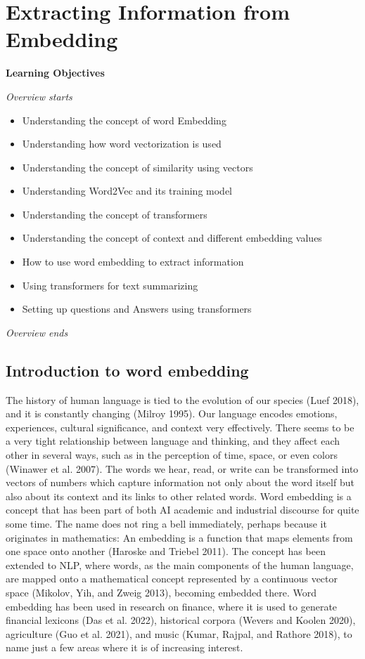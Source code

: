 \chapter{Extracting Information from
Embedding}\label{sec-extracting-information-from-embeddings}

\textbf{Learning Objectives}

\emph{Overview starts}

\begin{itemize}
\tightlist
\item
  Understanding the concept of word Embedding
\item
  Understanding how word vectorization is used
\item
  Understanding the concept of similarity using vectors
\item
  Understanding Word2Vec and its training model
\item
  Understanding the concept of transformers
\item
  Understanding the concept of context and different embedding values
\item
  How to use word embedding to extract information
\item
  Using transformers for text summarizing
\item
  Setting up questions and Answers using transformers
\end{itemize}

\emph{Overview ends}

\section{Introduction to word
embedding}\label{introduction-to-word-embeddings}

The history of human language is tied to the evolution of our species
(Luef 2018), and it is constantly changing (Milroy 1995). Our language
encodes emotions, experiences, cultural significance, and context very
effectively. There seems to be a very tight relationship between
language and thinking, and they affect each other in several ways, such
as in the perception of time, space, or even colors (Winawer et al.
2007). The words we hear, read, or write can be transformed into vectors
of numbers which capture information not only about the word itself but
also about its context and its links to other related words. Word
embedding is a concept that has been part of both AI academic and
industrial discourse for quite some time. The name does not ring a bell
immediately, perhaps because it originates in mathematics: An
embedding is a function that maps elements from one space onto another
(Haroske and Triebel 2011). The concept has been extended to NLP, where
words, as the main components of the human language, are mapped onto a
mathematical concept represented by a continuous vector space (Mikolov, Yih, and Zweig 2013), becoming embedded there. Word embedding has
been used in research on finance, where
it is used to generate financial lexicons (Das et al. 2022),
historical corpora (Wevers and Koolen 2020), agriculture (Guo et al.
2021), and music (Kumar, Rajpal, and Rathore 2018), to name just a
few areas where it is of increasing interest.

